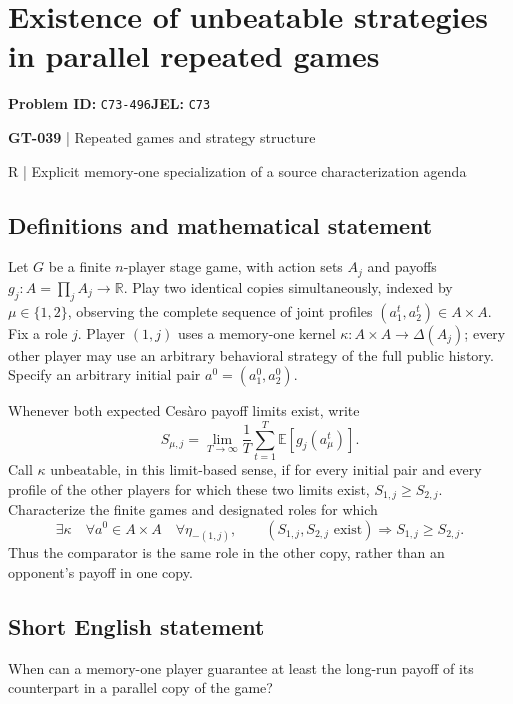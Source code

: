\documentclass[11pt,a4paper]{article}
\begin{document}
\section*{Existence of unbeatable strategies in parallel repeated games}
\textbf{Problem ID:} \texttt{C73-496}\quad \textbf{JEL:} \texttt{C73}\par
\label{problem:OP-0169}
\label{game:GT-039}
{\sffamily\small\color{muted}
{\sffamily\small\color{muted}\textbf{GT-039} | Repeated games and strategy structure\par R | Explicit memory-one specialization of a source characterization agenda\par}
\par}
\subsection*{Definitions and mathematical statement}
Let $G$ be a finite $n$-player stage game, with action sets $A_j$ and payoffs $g_j:A=\prod_jA_j\to\mathbb R$. Play two identical copies simultaneously, indexed by $\mu\in\{1,2\}$, observing the complete sequence of joint profiles $(a_1^t,a_2^t)\in A\times A$. Fix a role $j$. Player $(1,j)$ uses a memory-one kernel $\kappa:A\times A\to\Delta(A_j)$; every other player may use an arbitrary behavioral strategy of the full public history. Specify an arbitrary initial pair $a^0=(a_1^0,a_2^0)$.

Whenever both expected Ces\`aro payoff limits exist, write
\[
 S_{\mu,j}=\lim_{T\to\infty}\frac1T\sum_{t=1}^{T}\mathbb E[g_j(a_\mu^t)].
\]
Call $\kappa$ unbeatable, in this limit-based sense, if for every initial pair and every profile of the other players for which these two limits exist, $S_{1,j}\geq S_{2,j}$. Characterize the finite games and designated roles for which
\[
 \exists\kappa\quad\forall a^0\in A\times A\quad\forall\eta_{-(1,j)},
 \qquad (S_{1,j},S_{2,j}\text{ exist})\Longrightarrow S_{1,j}\geq S_{2,j}.
\]
Thus the comparator is the same role in the other copy, rather than an opponent's payoff in one copy.
\subsection*{Short English statement}
When can a memory-one player guarantee at least the long-run payoff of its counterpart in a parallel copy of the game?
\end{document}
